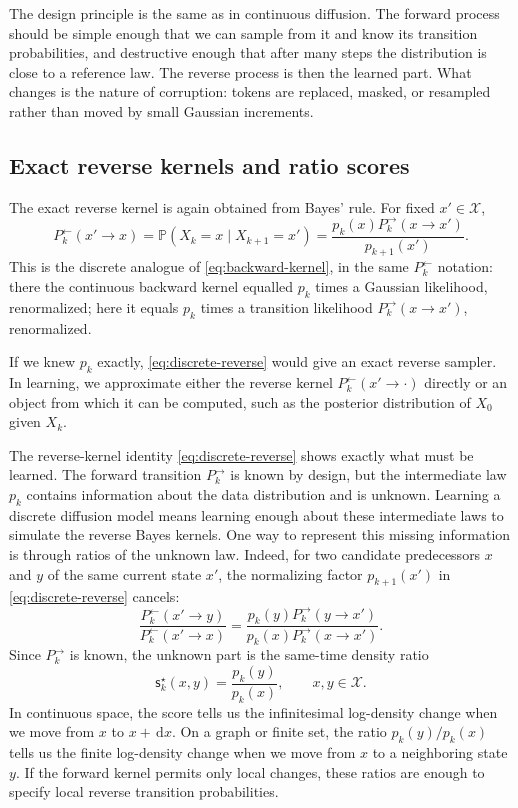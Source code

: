 \documentclass[10pt,a4paper]{amsart}
\numberwithin{equation}{section}
\newcommand{\Pp}{\mathbb{P}}
\newcommand{\dd}{\,\mathrm{d}}
\newcommand{\cX}{\mathcal{X}}
\newcommand{\sstar}{\mathsf{s}^{\star}}
\begin{document}
The design principle is the same as in continuous diffusion.  The
forward process should be simple enough that we can sample from it and know its
transition probabilities, and destructive enough that after many steps the
distribution is close to a reference law.  The reverse process is then the
learned part.  What changes is the nature of corruption: tokens are replaced,
masked, or resampled rather than moved by small Gaussian increments.


\subsection{Exact reverse kernels and ratio scores}

The exact reverse kernel is again obtained from Bayes' rule.  For fixed
$x'\in\cX$,
\begin{equation}\label{eq:discrete-reverse}
    P_k^{\leftarrow}(x' \to x)
    =
    \Pp(X_k=x\mid X_{k+1}=x')
    =
    \frac{p_k(x)P_k^{\to}(x \to x')}{p_{k+1}(x')}.
\end{equation}
This is the discrete analogue of \eqref{eq:backward-kernel}, in the same
$P_k^{\leftarrow}$ notation: there the continuous backward kernel equalled $p_k$
times a Gaussian likelihood, renormalized; here it equals $p_k$ times a
transition likelihood $P_k^{\to}(x \to x')$, renormalized.

If we knew $p_k$ exactly, \eqref{eq:discrete-reverse} would give an exact
reverse sampler.  In learning, we approximate either the reverse kernel
$P_k^{\leftarrow}(x' \to \cdot)$ directly or an object from which it can be computed,
such as the posterior distribution of $X_0$ given $X_k$.

The reverse-kernel identity \eqref{eq:discrete-reverse} shows exactly what must
be learned.  The forward transition $P_k^{\to}$ is known by design, but the
intermediate law $p_k$ contains information about the data distribution and is
unknown.  Learning a discrete diffusion model means learning enough about these
intermediate laws to simulate the reverse Bayes kernels.  One way to represent
this missing information is through ratios of the unknown law.  Indeed, for two
candidate predecessors $x$ and $y$ of the same current state $x'$, the
normalizing factor $p_{k+1}(x')$ in \eqref{eq:discrete-reverse} cancels:
\[
    \frac{P_k^{\leftarrow}(x' \to y)}{P_k^{\leftarrow}(x' \to x)}
    =
    \frac{p_k(y)P_k^{\to}(y \to x')}{p_k(x)P_k^{\to}(x \to x')}.
\]
Since $P_k^{\to}$ is known, the unknown part is the same-time density ratio
\begin{equation}\label{eq:discrete-ratio-score}
    \sstar_k(x,y)=\frac{p_k(y)}{p_k(x)},\qquad x,y\in\cX.
\end{equation}
In continuous space, the score tells us the infinitesimal log-density change
when we move from $x$ to $x+\dd x$.  On a graph or finite set, the ratio
$p_k(y)/p_k(x)$ tells us the finite log-density change when we move from
$x$ to a neighboring state $y$.  If the forward kernel permits only local
changes, these ratios are enough to specify local reverse transition
probabilities.
\end{document}
